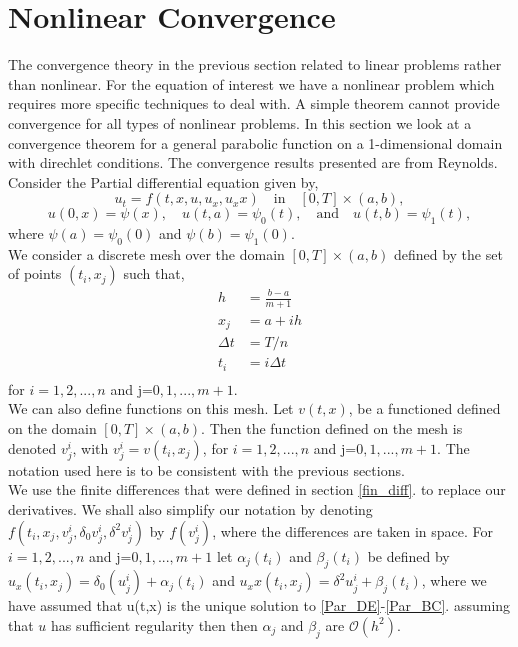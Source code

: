 \documentclass[12pt]{article}
\renewcommand{\O}{\mathcal{O}}
\theoremstyle{definition}
\begin{document}
\section{Nonlinear Convergence}
The convergence theory in the previous section related to linear problems rather than nonlinear. For the equation of interest we have a nonlinear problem which requires more specific techniques to deal with. A simple theorem cannot provide convergence for all types of nonlinear problems. In this section we look at a convergence theorem for a general parabolic function on a 1-dimensional domain with direchlet conditions. The convergence results presented are from Reynolds. \\
Consider the Partial differential equation given by,
\begin{equation}
u_t=f(t,x,u,u_x,u_xx)\quad	\text{in}\quad 	[0,T]\times(a,b), \label{Par_DE}
\end{equation}
\begin{equation}
u(0,x)=\psi(x),\quad u(t,a)=\psi_0(t), \quad \textrm{and} \quad u(t,b)=\psi_1(t), \label{Par_BC}
\end{equation}
where $\psi(a)=\psi_0(0)$ and $\psi(b)=\psi_1(0)$.\\
We consider a discrete mesh over the domain $[0,T]\times (a,b)$ defined by  the set of points $(t_i,x_j)$ such that,
\begin{align*}
h&=\frac{b-a}{m+1}\\
x_j&=a+ih\\
\Delta t&=T/n\\
t_i&= i\Delta t\\
\end{align*}
for $i=1,2,...,n$ and j=$0,1,...,m+1$.\\
We can also define functions on this mesh. Let $v(t,x)$, be a functioned defined on the domain $[0,T]\times (a,b)$. Then the function defined on the mesh is denoted $v_j^i$, with $v_j^i=v(t_i,x_j)$, for $i=1,2,...,n$ and j=$0,1,...,m+1$. The notation used here is to be consistent with the previous sections. \\
We use the finite differences that were defined in section \ref{fin_diff}. to replace our derivatives. We shall also simplify our notation by denoting $f(t_i,x_j,v^i_j,\delta_0v^i_j,\delta^2v^i_j)$ by $f(v^i_j)$, where the differences are taken in space. For $i=1,2,...,n$ and j=$0,1,...,m+1$ let $\alpha_j(t_i)$ and $\beta_j(t_i)$ be defined by $u_x(t_i,x_j)=\delta_0(u^i_j)+\alpha_j(t_i)$ and $u_xx(t_i,x_j)=\delta^2 u^i_j+\beta_j(t_i)$, where we have assumed that u(t,x) is the unique solution to \ref{Par_DE}-\ref{Par_BC}. assuming that $u$ has sufficient regularity then then $\alpha_j$ and $\beta_j$ are $\O (h^2)$.    
\end{document}
